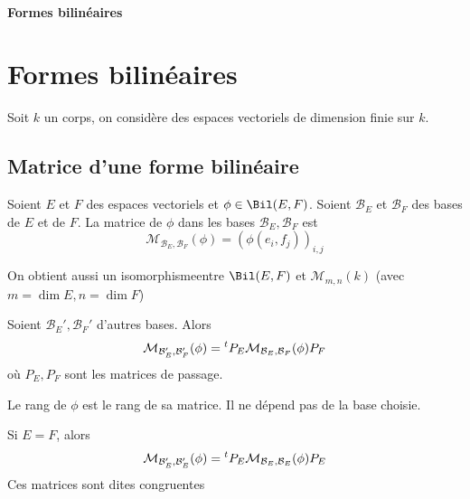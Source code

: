 \ifsolo
    ~

    \vspace{1cm}

    \begin{center}
        \textbf{\LARGE Formes bilinéaires} \\[1em]
    \end{center}
    \tableofcontents
\else
    \chapter{Formes bilinéaires}

    \minitoc
\fi
\thispagestyle{empty}

Soit $k$ un corps, on considère des espaces vectoriels de dimension finie sur $k$.

\section{Matrice d'une forme bilinéaire}

 \begin{dfn}
     Soient $E$ et  $F$ des espaces vectoriels et  $\phi \in  \Bil(E, F)$. Soient $\mathcal  B_E$ et $ \mathcal  B_F$ des bases de $E$ et de  $F$. La matrice de  $\phi$ dans les bases  $\mathcal B_E, \mathcal  B_F$ est \[
         \mathcal  M_{\mathcal  B_E, \mathcal  B_F}(\phi)= (\phi(e_i, f_j))_{i,j}
     \] 

     On obtient aussi un isomorphisme\footnotemark entre $\Bil(E, F)$ et  $\mathcal  M_{m,n}(k)$ (avec $m=\dim E, n=\dim F$)
\end{dfn}


\begin{rem}
Soient $\mathcal  B_E', \mathcal  B_F'$ d'autres bases. Alors \[
    \mathcal  M_{\mathcal  B_E', \mathcal  B_F'}(\phi)={}^t P_E \mathcal M_{\mathcal  B_E, \mathcal  B_F}(\phi)P_F
\] 
où $P_E, P_F$ sont les matrices de passage.
\end{rem}

\begin{dfn}
Le rang de $\phi$ est le rang de sa matrice. Il ne dépend pas de la base choisie.
\end{dfn}

\begin{rem}
Si $E=F$, alors  \[
    \mathcal  M_{\mathcal  B_E', \mathcal  B_E'}(\phi)={}^t P_E \mathcal M_{\mathcal  B_E, \mathcal B_E}(\phi)P_E
\] 
Ces matrices sont dites congruentes
\end{rem}


